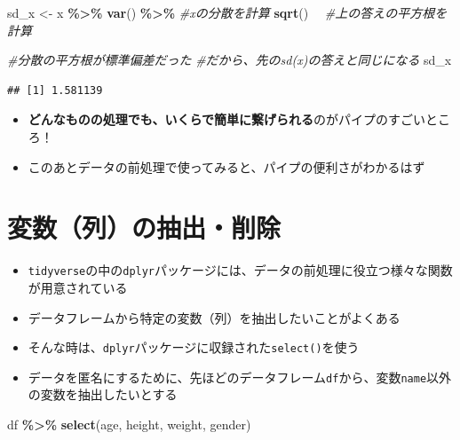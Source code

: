 \documentclass[
]{book}
\newenvironment{Shaded}{\begin{snugshade}}{\end{snugshade}}
\newcommand{\CommentTok}[1]{\textcolor[rgb]{0.56,0.35,0.01}{\textit{#1}}}
\newcommand{\FunctionTok}[1]{\textcolor[rgb]{0.13,0.29,0.53}{\textbf{#1}}}
\newcommand{\NormalTok}[1]{#1}
\newcommand{\OtherTok}[1]{\textcolor[rgb]{0.56,0.35,0.01}{#1}}
\newcommand{\SpecialCharTok}[1]{\textcolor[rgb]{0.81,0.36,0.00}{\textbf{#1}}}
\providecommand{\tightlist}{%
  \setlength{\itemsep}{0pt}\setlength{\parskip}{0pt}}
\begin{document}
\begin{Shaded}
\begin{Highlighting}[]
\NormalTok{sd\_x }\OtherTok{\textless{}{-}} 
\NormalTok{  x }\SpecialCharTok{\%\textgreater{}\%} 
  \FunctionTok{var}\NormalTok{() }\SpecialCharTok{\%\textgreater{}\%} \CommentTok{\#xの分散を計算}
  \FunctionTok{sqrt}\NormalTok{()　  }\CommentTok{\#上の答えの平方根を計算}

\CommentTok{\#分散の平方根が標準偏差だった}
\CommentTok{\#だから、先のsd(x)の答えと同じになる}
\NormalTok{sd\_x }
\end{Highlighting}
\end{Shaded}

\begin{verbatim}
## [1] 1.581139
\end{verbatim}

\begin{itemize}
\tightlist
\item
  \textbf{どんなものの処理でも、いくらで簡単に繋げられる}のがパイプのすごいところ！
\item
  このあとデータの前処理で使ってみると、パイプの便利さがわかるはず
\end{itemize}

\hypertarget{ux5909ux6570ux5217ux306eux62bdux51faux524aux9664}{%
\section{変数（列）の抽出・削除}\label{ux5909ux6570ux5217ux306eux62bdux51faux524aux9664}}

\begin{itemize}
\tightlist
\item
  \texttt{tidyverse}の中の\texttt{dplyr}パッケージには、データの前処理に役立つ様々な関数が用意されている
\item
  データフレームから特定の変数（列）を抽出したいことがよくある
\item
  そんな時は、\texttt{dplyr}パッケージに収録された\texttt{select()}を使う
\item
  データを匿名にするために、先ほどのデータフレーム\texttt{df}から、変数\texttt{name}以外の変数を抽出したいとする
\end{itemize}

\begin{Shaded}
\begin{Highlighting}[]
\NormalTok{df }\SpecialCharTok{\%\textgreater{}\%} 
  \FunctionTok{select}\NormalTok{(age, height, weight, gender) }
\end{Highlighting}
\end{Shaded}
\end{document}
